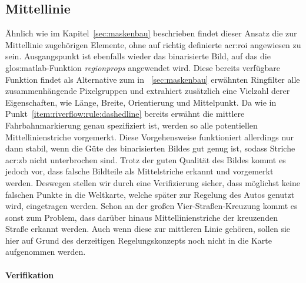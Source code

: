 \subsection{Mittellinie}
\label{ssec:fahrspurerkennung:riverflow:mittellinie}
Ähnlich wie im Kapitel~\ref{sec:maskenbau} beschrieben findet dieser Ansatz die zur Mittellinie zugehörigen Elemente, ohne auf richtig definierte \gls{acr:roi} angewiesen zu sein. Ausgangspunkt ist ebenfalls wieder das binarisierte Bild, auf das die \gls{glos:matlab}-Funktion \emph{regionprops} angewendet wird. Diese bereits verfügbare Funktion findet als Alternative zum in ~\ref{sec:maskenbau} erwähnten \glqq Ringfilter\grqq{} alle zusammenhängende Pixelgruppen und extrahiert zusätzlich eine Vielzahl derer Eigenschaften, wie Länge, Breite, Orientierung und Mittelpunkt. Da wie in Punkt~\ref{item:riverflow:rule:dashedline} bereits erwähnt die mittlere Fahrbahnmarkierung genau spezifiziert ist, werden so alle potentiellen Mittellinienstriche vorgemerkt. Diese Vorgehensweise funktioniert allerdings nur dann stabil, wenn die Güte des binarisierten Bildes gut genug ist, sodass Striche \gls{acr:zb} nicht unterbrochen sind. Trotz der guten Qualität des Bildes kommt es jedoch vor, dass falsche Bildteile als Mittelstriche erkannt und vorgemerkt werden. Deswegen stellen wir durch eine Verifizierung sicher, dass möglichst keine falschen Punkte in die Weltkarte, welche später zur Regelung des Autos genutzt wird, eingetragen werden. Schon an der großen Vier-Straßen-Kreuzung kommt es sonst zum Problem, dass darüber hinaus Mittellinienstriche der kreuzenden Straße erkannt werden. Auch wenn diese zur mittleren Linie gehören, sollen sie hier auf Grund des derzeitigen Regelungskonzepts noch nicht in die Karte aufgenommen werden. 

\paragraph{Verifikation}

